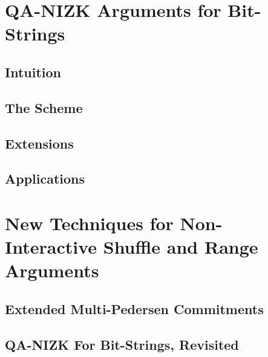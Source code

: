 \chapter {QA-NIZK Arguments for Bit-Strings} \label{sec:bits}
 
    

    \section{Intuition} \label{sec:bits-intuition}

         

    \section{The Scheme} \label{sec:bits-scheme}

        

    \section{Extensions} \label{sec:bits-extensions}

        

    \section{Applications} \label{sec:bits-applications}

        

\chapter{New Techniques for Non-Interactive Shuffle and Range Arguments}

    

    \section{Extended Multi-Pedersen Commitments}

        

    \section{QA-NIZK For Bit-Strings, Revisited}

